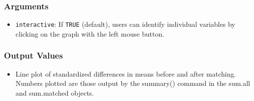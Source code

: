 \subsubsection{Arguments}

\begin{itemize}
\item {\tt interactive}: If \texttt{TRUE} (default), users can
  identify individual variables by clicking on the graph with the left
  mouse button.
\end{itemize}

\subsubsection{Output Values}

\begin{itemize}
\item Line plot of standardized differences in means before and after matching.  
Numbers plotted are those output by the summary() command in the sum.all and sum.matched
objects.  
\end{itemize}




